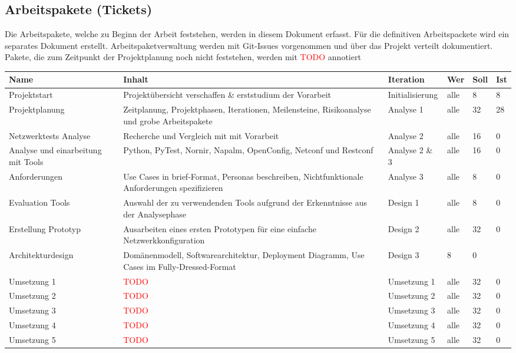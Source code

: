 \documentclass[
	ngerman,
	toc=listof, %
	toc=bibliography, %
	footnotes=multiple, %
	parskip=half, %
	numbers=noendperiod %
]{scrartcl}
\begin{document}
	\subsection{Arbeitspakete (Tickets) }
	Die Arbeitspakete, welche zu Beginn der Arbeit feststehen, werden in diesem Dokument erfasst.
	Für die definitiven Arbeitspackete wird ein separates Dokument erstellt.
	Arbeitspaketverwaltung werden mit Git-Issues vorgenommen und über das Projekt verteilt dokumentiert.
	Pakete, die zum Zeitpunkt der Projektplanung noch nicht feststehen, werden mit \textcolor{red}{TODO} annotiert	
	\begin{landscape}
			\begin{table}[!h]
				\begin{tabularx}{\linewidth}{lXllll}
					\toprule
					Name & Inhalt & Iteration & Wer & Soll & Ist\\
					\midrule
					Projektstart & Projektübersicht verschaffen \& erststudium der Vorarbeit & Initialisierung & alle & 8 & 8 \\
					\midrule
					Projektplanung & Zeitplanung, Projektphasen, Iterationen, Meilensteine, Risikoanalyse und grobe Arbeitspakete & Analyse 1 & alle & 32 & 28 \\
					Netzwerktests Analyse & Recherche und Vergleich mit mit Vorarbeit & Analyse 2 & alle & 16 & 0 \\
					Analyse und einarbeitung mit Tools & Python, PyTest, Nornir, Napalm, OpenConfig, Netconf und Restconf & Analyse 2 \& 3 & alle & 16 & 0 \\
					Anforderungen & Use Cases in brief-Format, Personas beschreiben, Nichtfunktionale Anforderungen spezifizieren & Analyse 3 & alle & 8 & 0 \\
					\midrule
					Evaluation Tools & Auswahl der zu verwendenden Tools aufgrund der Erkenntnisse aus der Analysephase & Design 1 & alle & 8 & 0 \\
					Erstellung Prototyp & Ausarbeiten eines ersten Prototypen für eine einfache Netzwerkkonfiguration & Design 2 & alle & 32 & 0 \\
					Architekturdesign & Domänenmodell, Softwarearchitektur, Deployment Diagramm, Use Cases im Fully-Dressed-Format & Design 3 & 8 & 0 \\
					\midrule
					Umsetzung 1 & \textcolor{red}{TODO} & Umsetzung 1 & alle & 32 & 0 \\
					Umsetzung 2 & \textcolor{red}{TODO} & Umsetzung 2 & alle & 32 & 0 \\
					Umsetzung 3 & \textcolor{red}{TODO} & Umsetzung 3 & alle & 32 & 0 \\
					Umsetzung 4 & \textcolor{red}{TODO} & Umsetzung 4 & alle & 32 & 0 \\
					Umsetzung 5 & \textcolor{red}{TODO} & Umsetzung 5 & alle & 32 & 0 \\
	

\end{tabularx}
\end{table}
\end{landscape}
\end{document}
